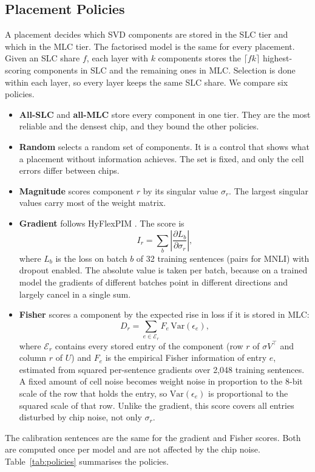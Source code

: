 \documentclass[conference]{IEEEtran}
\begin{document}
\subsection{Placement Policies}
A placement decides which SVD components are stored in the SLC tier and which in the MLC tier. The
factorised model is the same for every placement. Given an SLC share $f$, each layer with $k$ components
stores the $\lceil fk\rceil$ highest-scoring components in SLC and the remaining ones in MLC. Selection is
done within each layer, so every layer keeps the same SLC share. We compare six policies.
\begin{itemize}
\item \textbf{All-SLC} and \textbf{all-MLC} store every component in one tier. They are the most reliable
and the densest chip, and they bound the other policies.
\item \textbf{Random} selects a random set of components. It is a control that shows what a placement
without information achieves. The set is fixed, and only the cell errors differ between chips.
\item \textbf{Magnitude} scores component $r$ by its singular value $\sigma_r$. The largest singular values
carry most of the weight matrix.
\item \textbf{Gradient} follows HyFlexPIM \cite{song2025hyflexpim}. The score is
\begin{equation}
I_r=\sum_{b}\left|\frac{\partial L_b}{\partial\sigma_r}\right|,
\end{equation}
where $L_b$ is the loss on batch $b$ of 32 training sentences (pairs for MNLI) with dropout enabled. The absolute value
is taken per batch, because on a trained model the gradients of different batches point in different
directions and largely cancel in a single sum.
\item \textbf{Fisher} scores a component by the expected rise in loss if it is stored in MLC:
\begin{equation}
D_r=\sum_{e\in\mathcal{E}_r}F_e\,\mathrm{Var}(\epsilon_e),
\end{equation}
where $\mathcal{E}_r$ contains every stored entry of the component (row $r$ of $\sigma V^{\top}$ and column
$r$ of $U$) and $F_e$ is the empirical Fisher information of entry $e$, estimated from squared
per-sentence gradients over 2,048 training sentences. A fixed amount of cell noise becomes weight noise in
proportion to the 8-bit scale of the row that holds the entry, so $\mathrm{Var}(\epsilon_e)$ is proportional
to the squared scale of that row. Unlike the gradient, this score covers all entries disturbed by chip noise,
not only $\sigma_r$.
\end{itemize}
The calibration sentences are the same for the gradient and Fisher scores. Both are computed once per model
and are not affected by the chip noise. Table~\ref{tab:policies} summarises the policies.
\end{document}
